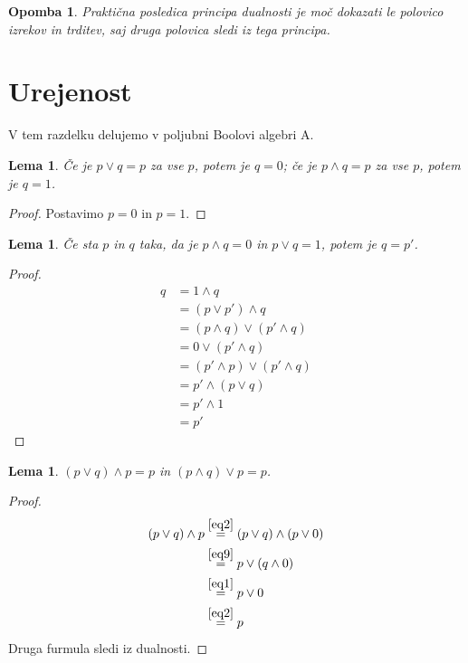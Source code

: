 \documentclass{amsart}
\newtheorem{lema}[izrek]{Lema}
\newtheorem{opomba}[izrek]{Opomba}
\begin{document}
\begin{opomba}
    Praktična posledica principa dualnosti je moč dokazati le polovico izrekov in trditev, 
    saj druga polovica sledi iz tega principa.
\end{opomba}

\section{Urejenost}

V tem razdelku delujemo v poljubni Boolovi algebri A.

\begin{lema}
    \label{lema-1}
    Če je \(p \vee q = p\) za vse \(p\), potem je \(q = 0\); če je 
    \(p \wedge q = p\) za vse \(p\), potem je \(q = 1\).
\end{lema}

\begin{proof}
    Postavimo $p = 0$ in $p = 1$.
\end{proof}

\begin{lema}
    \label{lema0}
    Če sta $p$ in $q$ taka, da je $p\wedge q = 0$ in $p \vee q = 1$, potem je $q = p'$.
\end{lema}

\begin{proof}
    \begin{align*}
        q &= 1 \wedge q\\ &= (p \vee p') \wedge q  \\&=(p \wedge q) \vee (p' \wedge q) \\ &= 
        0 \vee (p' \wedge q)\\  &= (p' \wedge p) \vee (p' \wedge q) \\  &= p' \wedge (p \vee q) 
        \\  &= p' \wedge 1
        \\  &= p'
    \end{align*}
\end{proof}

\begin{lema}
    \label{lema1}
    \(\left(p \vee q\right) \wedge p = p\) in \(\left(p \wedge q\right) \vee p = p\).
\end{lema}

\begin{proof} 
    \begin{align*}
        \left(p \vee q\right) \wedge p &\stackrel{\eqref{eq2}}{=} \left(p \vee q\right) \wedge \left(p \vee 0 \right) \\
                    &\stackrel{\eqref{eq9}}{=} p \vee \left(q \wedge 0\right)\\
                    &\stackrel{\eqref{eq1}}{=} p \vee 0\\
                    &\stackrel{\eqref{eq2}}{=} p 
    \end{align*}
    Druga furmula sledi iz dualnosti.

\end{proof}
\end{document}
